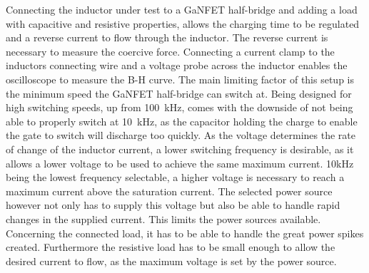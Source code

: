 Connecting the inductor under test to a \ac{GaNFET} half-bridge and adding a load with capacitive and resistive properties, allows the charging time to be regulated and a reverse current to flow through the inductor. The reverse current is necessary to measure the coercive force. Connecting a current clamp to the inductors connecting wire and a voltage probe across the inductor enables the oscilloscope to measure the B-H curve. The main limiting factor of this setup is the minimum speed the \ac{GaNFET} half-bridge can switch at. Being designed for high switching speeds, up from \SI{100}{\kilo\Hz}, comes with the downside of not being able to properly switch at \SI{10}{\kilo\Hz}, as the capacitor holding the charge to enable the gate to switch will discharge too quickly. As the voltage determines the rate of change of the inductor current, a lower switching frequency is desirable, as it allows a lower voltage to be used to achieve the same maximum current. 10kHz being the lowest frequency selectable, a higher voltage is necessary to reach a maximum current above the saturation current. The selected power source however not only has to supply this voltage but also be able to handle rapid changes in the supplied current. This limits the power sources available. Concerning the connected load, it has to be able to handle the great power spikes created. Furthermore the resistive load has to be small enough to allow the desired current to flow, as the maximum voltage is set by the power source.\\

